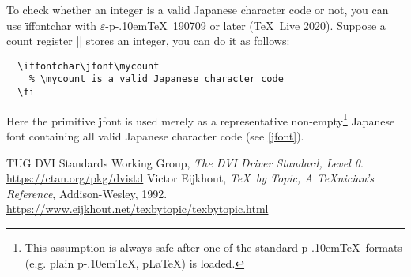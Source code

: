 \documentclass[a4paper,11pt,dvipdfmx]{article}
\def\eTeXpre{$\varepsilon$-}
\def\epTeX{\leavevmode\hbox{\eTeXpre\pTeX}}
\def\pTeX{p\kern-.10em\TeX}\def\upTeX{u\pTeX}
\def\pLaTeX{p\LaTeX}\def\upLaTeX{u\pLaTeX}
\def\TL{\TeX\ Live\xspace}
\begin{document}
To check whether an integer is a valid Japanese character code or not,
you can use \.{iffontchar} with \epTeX~190709 or later (\TL2020).
Suppose a count register |\mycount| stores an integer, you can do it as follows:
\begin{verbatim}
  \iffontchar\jfont\mycount
    % \mycount is a valid Japanese character code
  \fi
\end{verbatim}
Here the primitive \.{jfont} is used merely as
a representative non-empty\footnote{This assumption is always safe after
one of the standard \pTeX\ formats (e.g. plain \pTeX, \pLaTeX) is loaded.}
Japanese font containing all valid Japanese character code (see \ref{jfont}).


\newpage

\begin{thebibliography}{99}
  TUG DVI Standards Working Group,
  \textit{The DVI Driver Standard, Level 0}.\\
  \url{https://ctan.org/pkg/dvistd}
  Victor Eijkhout, \textit{\TeX\ by Topic, A \TeX nician's Reference},
  Addison-Wesley, 1992.\\
  \url{https://www.eijkhout.net/texbytopic/texbytopic.html}
\end{thebibliography}

\newpage
\printindex
\end{document}
